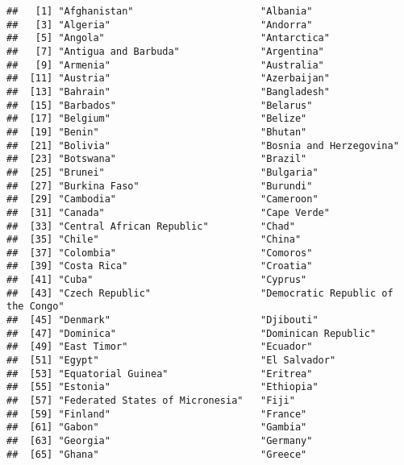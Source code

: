 \documentclass[]{article}
\begin{document}
\begin{verbatim}
##   [1] "Afghanistan"                      "Albania"                         
##   [3] "Algeria"                          "Andorra"                         
##   [5] "Angola"                           "Antarctica"                      
##   [7] "Antigua and Barbuda"              "Argentina"                       
##   [9] "Armenia"                          "Australia"                       
##  [11] "Austria"                          "Azerbaijan"                      
##  [13] "Bahrain"                          "Bangladesh"                      
##  [15] "Barbados"                         "Belarus"                         
##  [17] "Belgium"                          "Belize"                          
##  [19] "Benin"                            "Bhutan"                          
##  [21] "Bolivia"                          "Bosnia and Herzegovina"          
##  [23] "Botswana"                         "Brazil"                          
##  [25] "Brunei"                           "Bulgaria"                        
##  [27] "Burkina Faso"                     "Burundi"                         
##  [29] "Cambodia"                         "Cameroon"                        
##  [31] "Canada"                           "Cape Verde"                      
##  [33] "Central African Republic"         "Chad"                            
##  [35] "Chile"                            "China"                           
##  [37] "Colombia"                         "Comoros"                         
##  [39] "Costa Rica"                       "Croatia"                         
##  [41] "Cuba"                             "Cyprus"                          
##  [43] "Czech Republic"                   "Democratic Republic of the Congo"
##  [45] "Denmark"                          "Djibouti"                        
##  [47] "Dominica"                         "Dominican Republic"              
##  [49] "East Timor"                       "Ecuador"                         
##  [51] "Egypt"                            "El Salvador"                     
##  [53] "Equatorial Guinea"                "Eritrea"                         
##  [55] "Estonia"                          "Ethiopia"                        
##  [57] "Federated States of Micronesia"   "Fiji"                            
##  [59] "Finland"                          "France"                          
##  [61] "Gabon"                            "Gambia"                          
##  [63] "Georgia"                          "Germany"                         
##  [65] "Ghana"                            "Greece"                          

\end{verbatim}
\end{document}
